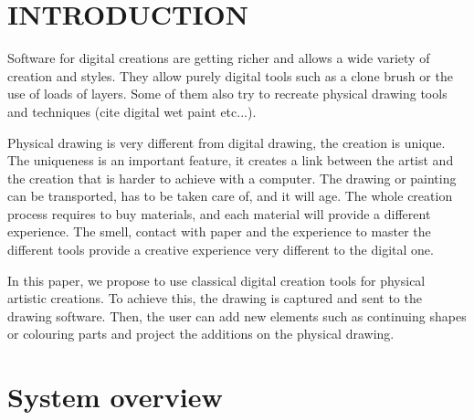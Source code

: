\documentclass{article}
\begin{document}




\section{INTRODUCTION}

Software for digital creations are getting richer and allows a wide variety of creation and styles. They allow purely digital tools such as a clone brush or the use of loads of layers. Some of them also try to recreate physical drawing tools and techniques (cite digital wet paint etc...). 

Physical drawing is very different from digital drawing, the creation is unique. The uniqueness is an important feature, it creates a link between the artist and the creation that is harder to achieve with a computer. The drawing or painting can be transported, has to be taken care of, and it will age. The whole creation process requires to buy materials, and each material will provide a different experience. The smell, contact with paper and the experience to master the different tools provide a creative experience very different to the digital one. 

In this paper, we propose to use classical digital creation tools for physical artistic creations. To achieve this, the drawing is captured and sent to the drawing software. Then, the user can add new elements such as continuing shapes or colouring parts and project the additions on the physical drawing.   


\section{System overview}

\end{document}
